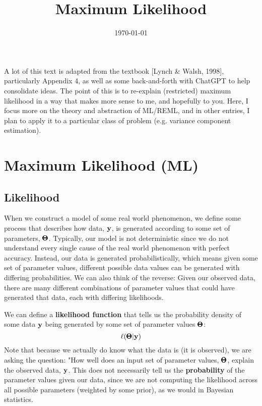 \documentclass[12pt]{article}
\title{Maximum Likelihood}
\date{\today}
\begin{document}
\maketitle

A lot of this text is adapted from the textbook [Lynch \& Walsh, 1998], particularly Appendix 4, as well as some back-and-forth with ChatGPT to help consolidate ideas.
The point of this is to re-explain (restricted) maximum likelihood in a way that makes more sense to me, and hopefully to you. Here, I focus more on the theory and abstraction of ML/REML, and in other entries, I plan to apply it to a particular class of problem (e.g. variance component estimation).

\section{Maximum Likelihood (ML)}

\subsection{Likelihood}

When we construct a model of some real world phenomenon, we define some process that describes how data, $\mathbf{y}$, is generated according to some set of parameters, $\pmb{\Theta}$.
Typically, our model is not deterministic since we do not understand every single cause of the real world phenomenon with perfect accuracy.
Instead, our data is generated probabilistically, which means given some set of parameter values, different possible data values can be generated with differing probabilities.
We can also think of the reverse:
Given our observed data, there are many different combinations of parameter values that could have generated that data, each with differing likelihoods.

We can define a \textbf{likelihood function} that tells us the probability density of some data $\mathbf{y}$ being generated by some set of parameter values $\pmb{\Theta}$:
$$ \ell(\pmb{\Theta} | \mathbf{y}) $$
Note that because we actually do know what the data is (it is observed), we are asking the question: "How well does an input set of parameter values, $\pmb{\Theta}$, explain the observed data, $\mathbf{y}$.
This does not necessarily tell us the \textbf{probability} of the parameter values given our data, since we are not computing the likelihood across all possible parameters (weighted by some prior), as we would in Bayesian statistics.
\end{document}
